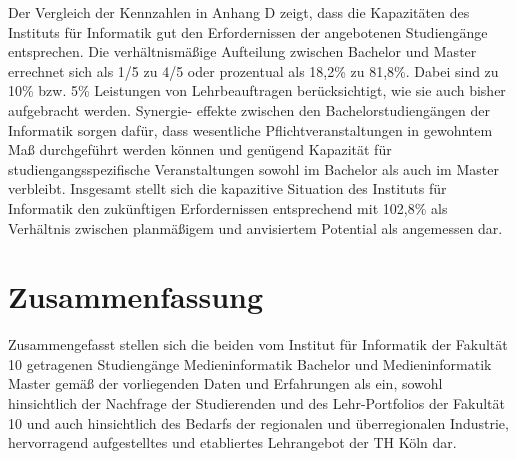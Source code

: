 Der Vergleich der Kennzahlen in Anhang D zeigt, dass die Kapazitäten des
Instituts für Informatik gut den Erfordernissen der angebotenen
Studiengänge entsprechen. Die verhältnismäßige Aufteilung zwischen
Bachelor und Master errechnet sich als 1/5 zu 4/5 oder prozentual als
18,2\% zu 81,8\%. Dabei sind zu 10\% bzw. 5\% Leistungen von
Lehrbeauftragen berücksichtigt, wie sie auch bisher aufgebracht werden.
Synergie- effekte zwischen den Bachelorstudiengängen der Informatik
sorgen dafür, dass wesentliche Pflichtveranstaltungen in gewohntem Maß
durchgeführt werden können und genügend Kapazität für
studiengangsspezifische Veranstaltungen sowohl im Bachelor als auch im
Master verbleibt. Insgesamt stellt sich die kapazitive Situation des
Instituts für Informatik den zukünftigen Erfordernissen entsprechend mit
102,8\% als Verhältnis zwischen planmäßigem und anvisiertem Potential
als angemessen dar.

\chapter{Zusammenfassung}\label{zusammenfassung}

Zusammengefasst stellen sich die beiden vom Institut für Informatik der
Fakultät 10 getragenen Studiengänge Medieninformatik Bachelor und
Medieninformatik Master gemäß der vorliegenden Daten und Erfahrungen als
ein, sowohl hinsichtlich der Nachfrage der Studierenden und des
Lehr-Portfolios der Fakultät 10 und auch hinsichtlich des Bedarfs der
regionalen und überregionalen Industrie, hervorragend aufgestelltes und
etabliertes Lehrangebot der TH Köln dar.
